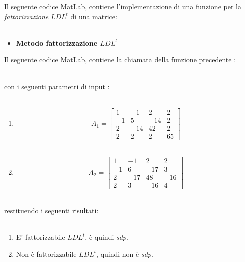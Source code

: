 Il seguente codice MatLab, contiene l'implementazione di una funzione per la \textit{fattorizzazione} $LDL^t$ di una matrice:\\\
\begin{itemize}
\item \textbf{Metodo fattorizzazione $LDL^t$}

\end{itemize}
Il seguente codice MatLab, contiene la chiamata della funzione precedente :\\\

con i seguenti parametri di input :\\\
\begin{enumerate}
\item
\[
A_1 =\begin{bmatrix}
	1  & -1  & 2   & 2  \\ 
	-1 & 5   & -14 & 2  \\
	2  & -14 & 42  & 2  \\
	2  & 2   & 2   & 65 
\end{bmatrix}
\]\\
\item
\[
A_2 =\begin{bmatrix}
	1  & -1  & 2   & 2   \\ 
	-1 & 6   & -17 & 3   \\
	2  & -17 & 48  & -16 \\
	2  & 3   & -16 & 4   
\end{bmatrix}
\]\\
\end{enumerate}
restituendo i seguenti risultati:\\\
\begin{enumerate}
\item
E' fattorizzabile $LDL^t$, è quindi \textit{sdp}.
\item
Non è fattorizzabile $LDL^t$, quindi non è \textit{sdp}.
\end{enumerate}